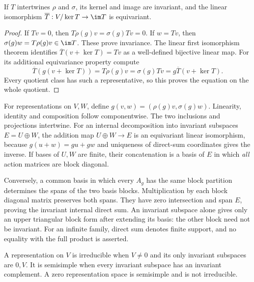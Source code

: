 \begin{proposition}
If $T$ intertwines $\rho$ and $\sigma$, its kernel and image are
invariant, and the linear isomorphism
$\overline T:V/\ker T\to\im T$ is equivariant.
\end{proposition}
\begin{proof}
If $Tv=0$, then $T\rho(g)v=\sigma(g)Tv=0$.
If $w=Tv$, then $\sigma(g)w=T\rho(g)v\in\im T$.
These prove invariance. The linear first isomorphism theorem
identifies $\overline T(v+\ker T)=Tv$ as a well-defined bijective
linear map. For its additional equivariance property compute
\[
 \overline T(g(v+\ker T))=T\rho(g)v
   =\sigma(g)Tv=g\overline T(v+\ker T).
\]
Every quotient class has such a representative, so this proves the
equation on the whole quotient.
\end{proof}

For representations on $V,W$, define
$g(v,w)=(\rho(g)v,\sigma(g)w)$. Linearity, identity and
composition follow componentwise. The two inclusions and projections
intertwine. For an internal decomposition into invariant subspaces
$E=U\oplus W$, the addition map $U\oplus W\to E$ is an
equivariant linear isomorphism, because
$g(u+w)=gu+gw$ and uniqueness of direct-sum coordinates gives the
inverse. If bases of $U,W$ are finite, their concatenation is a basis
of $E$ in which \emph{all} action matrices are block diagonal.

Conversely, a common basis in which every $A_g$ has the same block
partition determines the spans of the two basis blocks. Multiplication
by each block diagonal matrix preserves both spans. They have zero
intersection and span $E$, proving the invariant internal direct sum.
An invariant subspace alone gives only an upper triangular block
form after extending its basis: the other block need not be invariant.
For an infinite family, direct sum denotes finite support, and no
equality with the full product is asserted.

A representation on $V$ is irreducible when $V\ne0$ and its only
invariant subspaces are $0,V$. It is semisimple when every invariant
subspace has an invariant complement. A zero representation space is
semisimple and is not irreducible.

